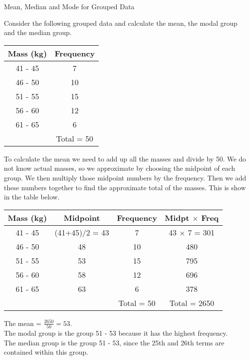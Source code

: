 \documentclass[10pt,a4paper,titlepage,twoside,openright]{report}
\begin{document}
\begin{wex}{Mean, Median and Mode for Grouped Data}{

Consider the following grouped data and calculate the mean, the modal group and the median group.

\begin{center}
\begin{tabular}{|c|c|}\hline
Mass (kg) & Frequency\\\hline
41 - 45 & 7 \\
46 - 50 & 10 \\
51 - 55 & 15 \\
56 - 60 & 12 \\
61 - 65 & 6 \\\hline
 & Total = 50 \\\hline
\end{tabular}
\end{center}}

To calculate the mean we need to add up all the masses and divide by 50. We do not know actual masses, so we approximate by choosing the midpoint of each group. We then multiply those midpoint numbers by the frequency. Then we add these numbers together to find the approximate total of the masses. This is show in the table below.

\begin{center}
\begin{tabular}{|c|c|c|c|}\hline
Mass (kg) & Midpoint & Frequency & Midpt $\times$ Freq \\\hline
41 - 45 & (41+45)/2 = 43 & 7 & 43 $\times$ 7 = 301 \\
46 - 50 & 48 & 10 & 480 \\
51 - 55 & 53 & 15 & 795 \\
56 - 60 & 58 & 12 & 696 \\
61 - 65 & 63 & 6 & 378 \\\hline
 & & Total = 50 & Total = 2650 \\\hline
\end{tabular}
\end{center}

The mean = $\frac{2650}{50} = 53$.\\
The modal group is the group 51 - 53 because it has the highest frequency.\\
The median group is the group 51 - 53, since the 25th and 26th terms are contained within this group. 

\end{wex}
\end{document}
